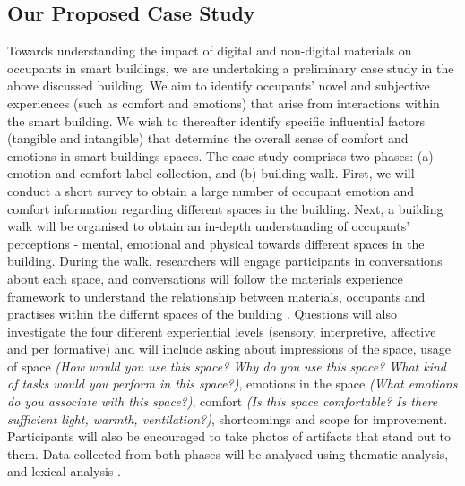 \documentclass[manuscript, anonymous, review]{acmart}
\begin{document}
\subsection{Our Proposed Case Study} 
Towards understanding the impact of digital and non-digital materials on occupants in smart buildings, we are undertaking a preliminary case study in the above discussed building.
We aim to identify occupants' novel and subjective experiences (such as comfort and emotions) that arise from interactions within the smart building. We wish to thereafter identify specific influential factors (tangible and intangible) that determine the overall sense of comfort and emotions in smart buildings spaces. The case study comprises two phases: (a) emotion and comfort label collection, and (b) building walk. First, we will conduct a short survey to obtain a large number of occupant emotion and comfort information regarding different spaces in the building. Next, a building walk will be organised to obtain an in-depth understanding of occupants' perceptions - mental, emotional and physical towards different spaces in the building. During the walk, researchers will engage participants in conversations about each space, and conversations will follow the materials experience framework to understand the relationship between materials, occupants and practises within the differnt spaces of the building \cite{giaccardi2015foundations}. Questions will also investigate the four different experiential levels (sensory, interpretive, affective and per formative) and will include asking about impressions of the space, usage of space \textit{(How would you use this space? Why do you use this space? What kind of tasks would you perform in this space?)}, emotions in the space \textit{(What emotions do you associate with this space?)}, comfort \textit{(Is this space comfortable? Is there sufficient light, warmth, ventilation?)}, shortcomings and scope for improvement. Participants will also be encouraged to take photos of artifacts that stand out to them. Data collected from both phases will be analysed using thematic analysis, and lexical analysis \cite{braun2006using, xue2020mood}. 


\end{document}
